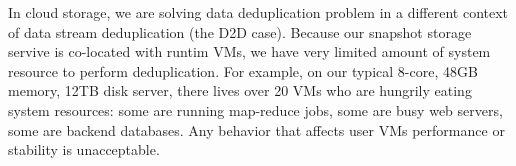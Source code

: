 In cloud storage, we are solving data deduplication problem in a different context of 
data stream deduplication (the D2D case). Because our snapshot storage servive is co-located with runtim VMs,
we have very limited amount of system resource to perform deduplication. For example,
on our typical 8-core, 48GB memory, 12TB disk server, there lives over 20 VMs who are hungrily eating
system resources: some are running map-reduce jobs, some are busy web servers, some are backend databases.
Any behavior that affects user VMs performance or stability is unacceptable.

